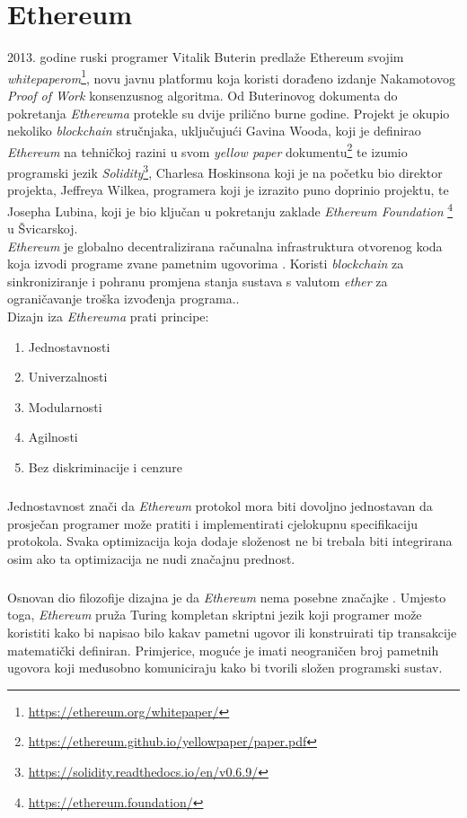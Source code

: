 \documentclass[times, utf8, zavrsni, numeric]{fer}
\begin{document}
\chapter{Ethereum}
2013. godine ruski programer Vitalik Buterin predlaže Ethereum svojim \emph{whitepaperom}\footnote{\url{https://ethereum.org/whitepaper/}}, novu javnu platformu koja koristi 
dorađeno izdanje Nakamotovog \emph{Proof of Work} konsenzusnog algoritma.
Od Buterinovog dokumenta do pokretanja \emph{Ethereuma} protekle su dvije prilično burne godine. Projekt je okupio nekoliko \emph{blockchain} stručnjaka, uključujući
Gavina Wooda, koji je definirao \emph{Ethereum} na tehničkoj razini u svom \emph{yellow paper} dokumentu\footnote{\url{https://ethereum.github.io/yellowpaper/paper.pdf}} te
izumio programski jezik \emph{Solidity}\footnote{\url{https://solidity.readthedocs.io/en/v0.6.9/}}, Charlesa Hoskinsona koji je na početku bio direktor projekta, Jeffreya
Wilkea, programera koji je izrazito puno doprinio projektu, te Josepha Lubina, koji je bio ključan u pokretanju zaklade \emph{Ethereum Foundation}
\footnote{\url{https://ethereum.foundation/}} u Švicarskoj.\citep{ffzg} \\
 \emph{Ethereum} je globalno decentralizirana računalna infrastruktura otvorenog koda koja
izvodi programe zvane pametnim ugovorima . Koristi \emph{blockchain} za sinkroniziranje i pohranu promjena stanja sustava s valutom \emph{ether}
za ograničavanje troška izvođenja programa.\citep{masteringEth}. \\
Dizajn iza \emph{Ethereuma} prati principe:

\begin{enumerate}
  \item Jednostavnosti
  \item Univerzalnosti
  \item Modularnosti
  \item Agilnosti
  \item Bez diskriminacije i cenzure
\end{enumerate}

\paragraph{}
Jednostavnost znači da \emph{Ethereum} protokol mora biti dovoljno jednostavan da prosječan programer može pratiti i implementirati cjelokupnu specifikaciju protokola.
Svaka optimizacija koja dodaje složenost ne bi trebala biti integrirana osim ako ta optimizacija ne nudi značajnu prednost.
\paragraph{}
Osnovan dio filozofije dizajna je da \emph{Ethereum} nema posebne značajke . Umjesto toga, \emph{Ethereum} pruža Turing kompletan skriptni jezik koji programer
može koristiti kako bi napisao bilo kakav pametni ugovor ili konstruirati tip transakcije matematički definiran. Primjerice, moguće je imati neograničen broj pametnih ugovora
koji međusobno komuniciraju kako bi tvorili složen programski sustav.
\end{document}
